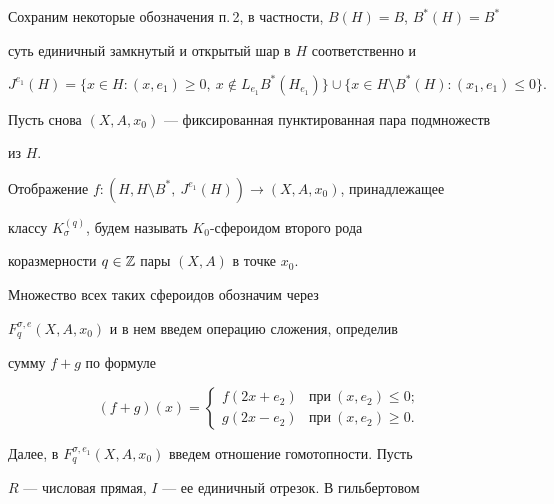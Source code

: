  


Сохраним некоторые обозначения п.\,2, в частности, $B(H)=B$, $B^*(H)=B^*$ 


суть единичный замкнутый и открытый шар в $H$ соответственно и 


$$ 


J^{e_1}(H)=\{x\in H: (x,e_1)\ge0,\ x\notin L_{e_1} 


B^*(H_{e_1})\}\cup\{x\in H\setminus B^*(H): (x_1,e_1)\le0\}. 


$$ 


 


Пусть снова $(X,A,x_0)$ --- фиксированная пунктированная пара подмножеств 


из $H$. 


 


\begin{defn} 


Отображение $f:(H,H\setminus B^*,\ J^{e_1}(H))\to(X,A,x_0)$, принадлежащее 


классу $K^{(q)}_\sigma$, будем называть $K_0$-сфероидом второго рода 


коразмерности $q\in\Bbb Z$ пары $(X,A)$ в точке $x_0$. 


\end{defn} 


 


Множество всех таких сфероидов обозначим через 


$F^{\sigma,e}_q(X,A,x_0)$ и в нем введем операцию сложения, определив 


сумму $f+g$ по формуле 


$$ 


(f+g)(x)= 


\begin{cases} 


f(2x+e_2)&\text{при}\ (x,e_2)\le0;\\ 


g(2x-e_2)&\text{при}\ (x,e_2)\ge0. 


\end{cases} 


$$ 


 


Далее, в $F^{\sigma,e_1}_q(X,A,x_0)$ введем отношение гомотопности. Пусть 


$R$ --- числовая прямая, $I$ --- ее единичный отрезок. В гильбертовом 


